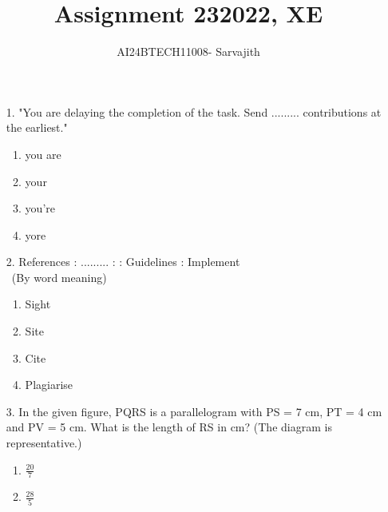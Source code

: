 \documentclass[journal]{IEEEtran}
\begin{document}

\vspace{3cm}


\author{AI24BTECH11008- Sarvajith
}
\title{Assignment 23}
{\let\newpage\relax\maketitle}
\title{2022, XE}
\renewcommand{\thefigure}{\theenumi}
\renewcommand{\thetable}{\theenumi}
\setlength{\intextsep}{10pt} %
\renewcommand{\thetable}{\theenumi}
\begin{enumerate}
    \item[1.] "You are delaying the completion of the task. Send ......... contributions at the
    earliest."
    \begin{enumerate}[label = (\Alph*)]
        \item you are
        \item your
        \item you're 
        \item yore
    \end{enumerate}
    \item[2.] References : ......... : : Guidelines : Implement\\\
    (By word meaning)
    \begin{enumerate}[label = (\Alph*)]
        \item Sight
        \item Site
        \item Cite 
        \item Plagiarise 
    \end{enumerate}
    \item[3.] In the given figure, PQRS is a parallelogram with PS = 7 cm, PT = 4 cm and
    PV = 5 cm. What is the length of RS in cm? (The diagram is representative.) 
    \begin{figure}[!ht]
        \centering
        \caption{}
    \end{figure}
    \begin{enumerate}[label = (\Alph*)]
        \item $\frac{20}{7}$
        \item $\frac{28}{5}$

\end{enumerate}
\end{enumerate}
\end{document}

